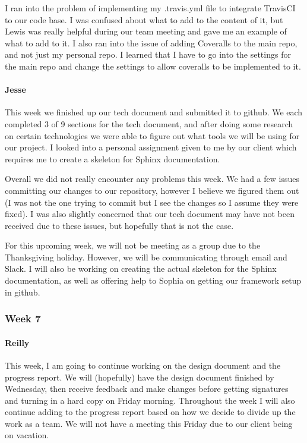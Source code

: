 \documentclass[onecolumn, draftclsnofoot,10pt, compsoc]{IEEEtran}
\begin{document}
\begin{flushleft}
 
I ran into the problem of implementing my .travis.yml file to integrate TravisCI to our code base. I was confused about what to add to the content of it, but Lewis was really helpful during our team meeting and gave me an example of what to add to it. I also ran into the issue of adding Coveralls to the main repo, and not just my personal repo. I learned that I have to go into the settings for the main repo and change the settings to allow coveralls to be implemented to it.
 
\paragraph{Jesse}
 
This week we finished up our tech document and submitted it to github. We each completed 3 of 9 sections for the tech document, and after doing some research on certain technologies we were able to figure out what tools we will be using for our project. I looked into a personal assignment given to me by our client which requires me to create a skeleton for Sphinx documentation.
 
 
Overall we did not really encounter any problems this week. We had a few issues committing our changes to our repository, however I believe we figured them out (I was not the one trying to commit but I see the changes so I assume they were fixed). I was also slightly concerned that our tech document may have not been received due to these issues, but hopefully that is not the case.
 
 
For this upcoming week, we will not be meeting as a group due to the Thanksgiving holiday. However, we will be communicating through email and Slack. I will also be working on creating the actual skeleton for the Sphinx documentation, as well as offering help to Sophia on getting our framework setup in github.
 
\subsubsection{Week 7}
\paragraph{Reilly}
 
This week, I am going to continue working on the design document and the progress report. We will (hopefully) have the design document finished by Wednesday, then receive feedback and make changes before getting signatures and turning in a hard copy on Friday morning. Throughout the week I will also continue adding to the progress report based on how we decide to divide up the work as a team. We will not have a meeting this Friday due to our client being on vacation.
 

\end{flushleft}
\end{document}
